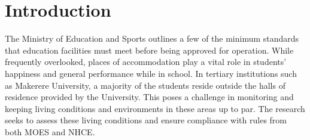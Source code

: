 \chapter{Introduction}

The Ministry of Education and Sports outlines a few of the minimum standards that education facilities must meet before being approved for operation. While frequently overlooked, places of accommodation play a vital role in students' happiness and general performance while in school. In tertiary institutions such as Makerere University, a majority of the students reside outside the halls of residence provided by the University. This poses a challenge in monitoring and keeping living conditions and  environments in these areas up to par. The research seeks to assess these living conditions and ensure compliance with rules from both MOES and NHCE.


